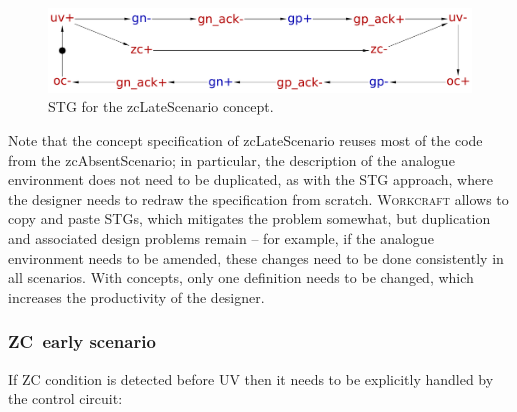 \documentclass[british, journal]{IEEEtran}
\newcommand{\noun}[1]{\textsc{#1}}
\begin{document}
\begin{figure}[H]
\begin{centering}
\vspace{-1mm}
\includegraphics[scale=0.23]{Images/stg-UV_before_ZC}
\par\end{centering}
\vspace{-1mm}
\protect\caption{\label{fig:zcLateScenario STG}STG for the
\textsf{zcLateScenario} concept.}
\vspace{-3mm}
\end{figure}

Note that the concept specification of \textsf{zcLateScenario} reuses most of
the code from the \textsf{zcAbsentScenario}; in particular, the description of
the analogue environment does not need to be duplicated, as with the STG
approach, where the designer needs to redraw the specification from scratch.
\noun{Workcraft} allows to copy and paste STGs, which mitigates the problem
somewhat, but duplication and associated design problems remain -- for example,
if
the analogue environment needs to be amended, these changes need to be done
consistently in all scenarios. With concepts, only one definition needs to be
changed, which increases the productivity of the designer.

\subsubsection{ZC~early scenario}

If ZC condition is detected before UV then it needs to be explicitly
handled by the control circuit:
\end{document}
